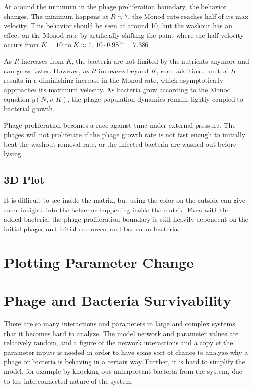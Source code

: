 At around the minimum in the phage proliferation boundary, the behavior changes. 
The minimum happens at $R\approx 7$, the Monod rate reaches half of its max velocity. 
This behavior should be seen at around 10, but the washout has an effect on the Monod rate by artificially shifting the point where the half velocity occurs from $K=10$ to $K\approx 7$. 
$10\cdot 0.98^{15} = 7.386$

As $R$ increases from $K$, the bacteria are not limited by the nutrients anymore and can grow faster. 
However, as $R$ increases beyond $K$, each additional unit of $R$ results in a diminishing increase in the Monod rate, which asymptotically approaches its maximum velocity. 
As bacteria grow according to the Monod equation $g(N, v, K)$, the phage population dynamics remain tightly coupled to bacterial growth. 

Phage proliferation becomes a race against time under external pressure. 
The phages will not proliferate if the phage growth rate is not fast enough to initially beat the washout removal rate, or the infected bacteria are washed out before lysing. 

\subsection{3D Plot}
It is difficult to see inside the matrix, but using the color on the outside can give some insights into the behavior happening inside the matrix. 
Even with the added bacteria, the phage proliferation boundary is still heavily dependent on the initial phages and initial resources, and less so on bacteria. 

\section{Plotting Parameter Change}

\section{Phage and Bacteria Survivability}
There are so many interactions and parameters in large and complex systems that it becomes hard to analyze. 
The model network and parameter values are relatively random, and a figure of the network interactions and a copy of the parameter inputs is needed in order to have some sort of chance to analyze why a phage or bacteria is behaving in a certain way. 
Further, it is hard to simplify the model, for example by knocking out unimportant bacteria from the system, due to the interconnected nature of the system. 


